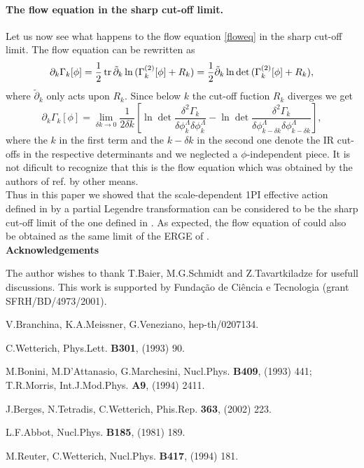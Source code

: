 \documentclass[a4paper,12pt]{article}
\begin{document}
\paragraph{The flow equation in the sharp cut-off limit.} Let us now see what happens to the flow equation \eqref{floweq} in the sharp cut-off limit. The flow equation can be rewritten as
\begin{equation}
               \partial_k \Gamma_k[\phi] = \frac{1}{2}\,\text{tr}\, \tilde{\partial}_k \ln{(\Gamma_k^{(2)}[\phi] + R_k)}=\frac{1}{2}\tilde{\partial}_k\ln\det{(\Gamma_k^{(2)}[\phi] + R_k)},
\end{equation}
where $\tilde{\partial}_k$ only acts upon $R_k$. Since below $k$ the cut-off fuction $R_k$ diverges we get
\begin{equation}
               \partial_k \Gamma_k[\phi] = \lim_{\delta k\to 0}\frac{1}{2\delta k} \left[\ln\det\frac{\delta^2 \Gamma_k}{\delta \phi^{\Lambda}_{k}\delta \phi^{\Lambda}_{k}}-\ln\det\frac{\delta^2 \Gamma_k}{\delta \phi^{\Lambda}_{k-\delta k}\delta \phi^{\Lambda}_{k-\delta k}}\right],
\end{equation}
where the $k$ in the first term and the $k-\delta k$ in the second one denote the IR cut-offs in the respective determinants and we neglected a $\phi$-independent piece. It is not dificult to recognize that this is the flow equation which was obtained by the authors of ref.\cite{Bra02} by other means.\\

Thus in this paper we showed that the scale-dependent 1PI effective action defined in \cite{Bra02} by a partial Legendre transformation can be considered to be the sharp cut-off limit of the one defined in \cite{wet93,bon93}. As expected, the flow equation of \cite{Bra02} could also be obtained as the same limit of the ERGE of \cite{wet93,bon93}.\\

{\bf Acknowledgements} 

The author wishes to thank T.Baier, M.G.Schmidt and Z.Tavartkiladze for usefull discussions. This work is supported by Funda\c c\~ ao de Ci\^ encia e Tecnologia (grant SFRH/BD/4973/2001).

\begin{thebibliography}{}

 V.Branchina, K.A.Meissner, G.Veneziano, hep-th/0207134.

 C.Wetterich, Phys.Lett. {\bf B301}, (1993) 90.

 M.Bonini, M.D'Attanasio, G.Marchesini, Nucl.Phys. {\bf B409}, (1993) 441; T.R.Morris, Int.J.Mod.Phys. {\bf A9}, (1994) 2411.

 J.Berges, N.Tetradis, C.Wetterich, Phis.Rep. {\bf 363}, (2002) 223.

 L.F.Abbot, Nucl.Phys. {\bf B185}, (1981) 189.

 M.Reuter, C.Wetterich, Nucl.Phys. {\bf B417}, (1994) 181.

\end{thebibliography}
\end{document}
